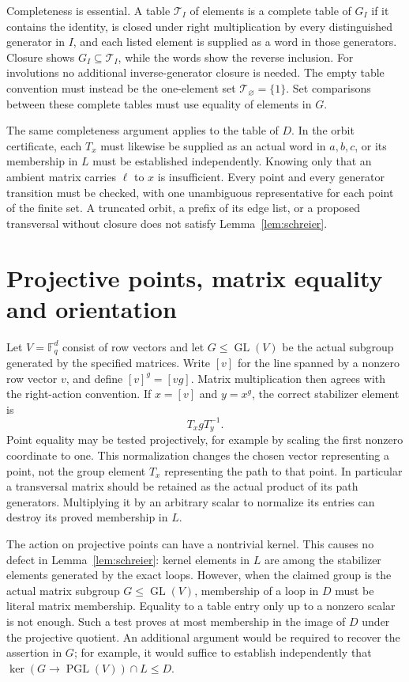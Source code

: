 \documentclass[11pt]{article}
\theoremstyle{remark}
\newcommand{\GL}{\operatorname{GL}}
\newcommand{\PGL}{\operatorname{PGL}}
\begin{document}
Completeness is essential. A table $\mathcal T_I$ of elements is a complete
table of $G_I$ if it contains the identity, is closed under right
multiplication by every distinguished generator in $I$, and each listed
element is supplied as a word in those generators. Closure shows
$G_I\subseteq\mathcal T_I$, while the words show the reverse inclusion.
For involutions no additional inverse-generator closure is needed. The
empty table convention must instead be the one-element set
$\mathcal T_\varnothing=\{1\}$. Set comparisons between these complete
tables must use equality of elements in $G$.

The same completeness argument applies to the table of $D$. In the orbit
certificate, each $T_x$ must likewise be supplied as an actual word in
$a,b,c$, or its membership in $L$ must be established independently.
Knowing only that an ambient matrix carries $\ell$ to $x$ is insufficient.
Every point and every generator transition must be checked, with one
unambiguous representative for each point of the finite set. A truncated
orbit, a prefix of its edge list, or a proposed transversal without closure
does not satisfy Lemma~\ref{lem:schreier}.

\section{Projective points, matrix equality and orientation}

Let $V=\mathbb F_q^d$ consist of row vectors and let
$G\leq\GL(V)$ be the actual subgroup generated by the specified matrices.
Write $[v]$ for the line spanned by a nonzero row vector $v$, and define
$[v]^g=[vg]$. Matrix multiplication then agrees with the right-action
convention. If $x=[v]$ and $y=x^g$, the correct stabilizer element is
\[
 T_xgT_y^{-1}.
\]
Point equality may be tested projectively, for example by scaling the
first nonzero coordinate to one. This normalization changes the chosen
vector representing a point, not the group element $T_x$ representing the
path to that point. In particular a transversal matrix should be retained
as the actual product of its path generators. Multiplying it by an
arbitrary scalar to normalize its entries can destroy its proved
membership in $L$.

The action on projective points can have a nontrivial kernel. This causes
no defect in Lemma~\ref{lem:schreier}: kernel elements in $L$ are among
the stabilizer elements generated by the exact loops. However, when the
claimed group is the actual matrix subgroup $G\leq\GL(V)$, membership
of a loop in $D$ must be literal matrix membership. Equality to a table
entry only up to a nonzero scalar is not enough. Such a test proves at
most membership in the image of $D$ under the projective quotient. An
additional argument would be required to recover the assertion in $G$;
for example, it would suffice to establish independently that
$\ker(G\longrightarrow\PGL(V))\cap L\leq D$.
\end{document}
